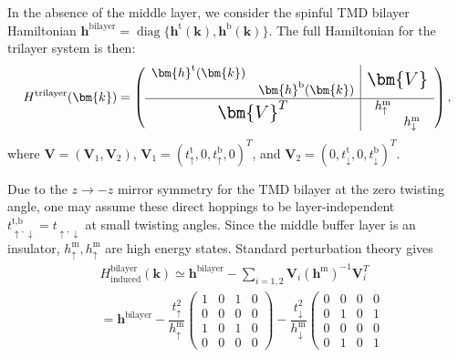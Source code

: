 \begin{subappendices}
	
	In the absence of the middle layer, we consider the spinful TMD bilayer Hamiltonian $\bm{h}^\text{bilayer}=\mathop{\mathrm{diag}}\{\bm{h}^\text{t}(\bm{k}), \bm{h}^\text{b}(\bm{k})\}$. The full Hamiltonian for the trilayer system is then:
	\begin{equation}\label{trilayer Hamiltonian}
		H^{\text{trilayer}}(\bm{k})=\left(\begin{array}{c|c}
			\begin{matrix}
				\bm{h}^\text{t}(\bm{k}) & \\
				 & \bm{h}^\text{b}(\bm{k})
			\end{matrix} & \text{\Large $\bm{V}$} \\
			\hline
			\text{\Large $\bm{V}^T$} & \begin{matrix}
				h^\text{m}_\uparrow & \\
				 & h^\text{m}_\downarrow
			\end{matrix}
		\end{array}\right),
	\end{equation}
	where $\bm{V}=(\bm{V}_1,\bm{V}_2)$, $\bm{V}_1=(t^\text{t}_\uparrow,0,t^\text{b}_\uparrow,0)^T$, and $\bm{V}_2=(0,t^\text{t}_\downarrow,0,t^\text{b}_\downarrow)^T$.\par
	Due to the $z\rightarrow -z$ mirror symmetry for the TMD bilayer at the zero twisting angle, one may assume these direct hoppings to be layer-independent $t^{\text{t,b}}_{\uparrow,\downarrow}=t_{\uparrow,\downarrow}$ at small twisting angles. Since the middle buffer layer is an insulator, 	$h^\text{m}_\uparrow,	h^\text{m}_\uparrow$ are high energy states. Standard perturbation theory gives
	\begin{align}
		&H^{\text{bilayer}}_\text{induced}(\bm{k})\simeq \bm{h}^{\text{bilayer}}-\sum_{i=1,2} \bm{V}_i(\bm{h}^\text{m})^{-1}\bm{V}_i^T\nonumber\\
		&=\bm{h}^{\text{bilayer}}-\dfrac{t_\uparrow^2}{h^\text{m}_\uparrow}\left(\begin{array}{cccc}
			1 & 0 & 1 & 0\\
			0 & 0 & 0 & 0\\
			1 & 0 & 1 & 0\\
			0 & 0 & 0 & 0
		\end{array}\right)-\dfrac{t_\downarrow^2}{h^\text{m}_\downarrow}\left(\begin{array}{cccc}
			0 & 0 & 0 & 0\\
			0 & 1 & 0 & 1\\
			0 & 0 & 0 & 0\\
			0 & 1 & 0 & 1

\end{array}
\end{align}
\end{subappendices}
